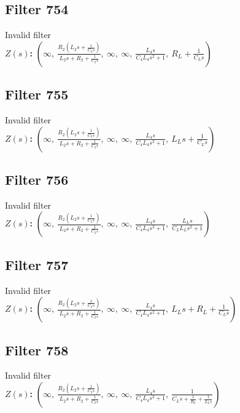 \documentclass{article}
\begin{document}
\subsection*{Filter 754}
Invalid filter \\ 
\textbf{$Z(s)$:} $\left( \infty, \  \frac{R_{2} \left(L_{2} s + \frac{1}{C_{2} s}\right)}{L_{2} s + R_{2} + \frac{1}{C_{2} s}}, \  \infty, \  \infty, \  \frac{L_{4} s}{C_{4} L_{4} s^{2} + 1}, \  R_{L} + \frac{1}{C_{L} s}\right)$ \\ 
\subsection*{Filter 755}
Invalid filter \\ 
\textbf{$Z(s)$:} $\left( \infty, \  \frac{R_{2} \left(L_{2} s + \frac{1}{C_{2} s}\right)}{L_{2} s + R_{2} + \frac{1}{C_{2} s}}, \  \infty, \  \infty, \  \frac{L_{4} s}{C_{4} L_{4} s^{2} + 1}, \  L_{L} s + \frac{1}{C_{L} s}\right)$ \\ 
\subsection*{Filter 756}
Invalid filter \\ 
\textbf{$Z(s)$:} $\left( \infty, \  \frac{R_{2} \left(L_{2} s + \frac{1}{C_{2} s}\right)}{L_{2} s + R_{2} + \frac{1}{C_{2} s}}, \  \infty, \  \infty, \  \frac{L_{4} s}{C_{4} L_{4} s^{2} + 1}, \  \frac{L_{L} s}{C_{L} L_{L} s^{2} + 1}\right)$ \\ 
\subsection*{Filter 757}
Invalid filter \\ 
\textbf{$Z(s)$:} $\left( \infty, \  \frac{R_{2} \left(L_{2} s + \frac{1}{C_{2} s}\right)}{L_{2} s + R_{2} + \frac{1}{C_{2} s}}, \  \infty, \  \infty, \  \frac{L_{4} s}{C_{4} L_{4} s^{2} + 1}, \  L_{L} s + R_{L} + \frac{1}{C_{L} s}\right)$ \\ 
\subsection*{Filter 758}
Invalid filter \\ 
\textbf{$Z(s)$:} $\left( \infty, \  \frac{R_{2} \left(L_{2} s + \frac{1}{C_{2} s}\right)}{L_{2} s + R_{2} + \frac{1}{C_{2} s}}, \  \infty, \  \infty, \  \frac{L_{4} s}{C_{4} L_{4} s^{2} + 1}, \  \frac{1}{C_{L} s + \frac{1}{R_{L}} + \frac{1}{L_{L} s}}\right)$ \\ 
\end{document}
